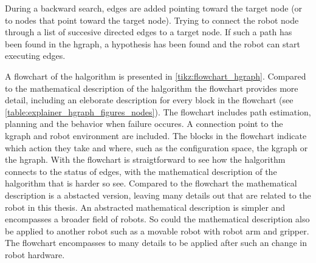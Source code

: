 During a backward search, edges are added pointing toward the target node (or to nodes that point toward the target node). Trying to connect the robot node through a list of succesive directed edges to a target node. If such a path has been found in the \ac{hgraph}, a hypothesis has been found and the robot can start executing edges.

A flowchart of the \ac{halgorithm} is presented in \cref{tikz:flowchart_hgraph}. Compared to the mathematical description of the \ac{halgorithm} the flowchart provides more detail, including an eleborate description for every block in the flowchart (see \cref{table:explainer_hgraph_figures_nodes}). The flowchart includes path estimation, planning and the behavior when failure occures. A connection point to the \ac{kgraph} and robot environment are included. The blocks in the flowchart indicate which action they take and where, such as the configuration space, the \ac{kgraph} or the \ac{hgraph}. With the flowchart is straigtforward to see how the \ac{halgorithm} connects to the status of edges, with the mathematical description of the \ac{halgorithm} that is harder so see. Compared to the flowchart the mathematical description is a abstacted version, leaving many details out that are related to the robot in this thesis. An abstracted mathematical description is simpler and encompasses a broader field of robots. So could the mathematical description also be applied to another robot such as a movable robot with robot arm and gripper. The flowchart encompasses to many details to be applied after such an change in robot hardware.



